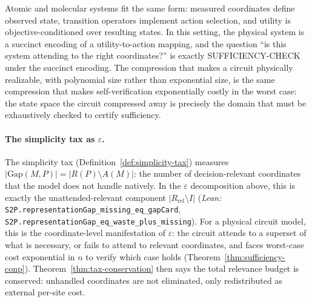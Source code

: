 Atomic and molecular systems fit the same form: measured coordinates define observed state, transition operators implement action selection, and utility is objective-conditioned over resulting states.
In this setting, the physical system is a succinct encoding of a utility-to-action mapping, and the question ``is this system attending to the right coordinates?'' is exactly SUFFICIENCY-CHECK under the succinct encoding.
The compression that makes a circuit physically realizable, with polynomial size rather than exponential size, is the same compression that makes self-verification exponentially costly in the worst case: the state space the circuit compressed away is precisely the domain that must be exhaustively checked to certify sufficiency.

\paragraph{The simplicity tax as $\varepsilon$.}
The simplicity tax (Definition~\ref{def:simplicity-tax}) measures $|\mathrm{Gap}(M,P)| = |R(P) \setminus A(M)|$: the number of decision-relevant coordinates that the model does not handle natively. In the $\varepsilon$ decomposition above, this is exactly the unattended-relevant component $|R_{\mathrm{rel}}\setminus I|$ (\textit{Lean:} \nolinkurl{S2P.representationGap_missing_eq_gapCard},
\nolinkurl{S2P.representationGap_eq_waste_plus_missing}). For a physical circuit model, this is the coordinate-level manifestation of $\varepsilon$: the circuit attends to a superset of what is necessary, or fails to attend to relevant coordinates, and faces worst-case cost exponential in $n$ to verify which case holds (Theorem~\ref{thm:sufficiency-conp}). Theorem~\ref{thm:tax-conservation} then says the total relevance budget is conserved: unhandled coordinates are not eliminated, only redistributed as external per-site cost.

